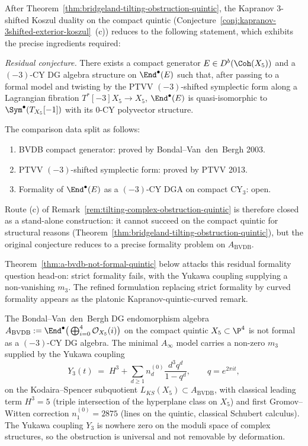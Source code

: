 \begin{remark}
\label{rem:kapranov-quintic-residual}
After Theorem~\ref{thm:bridgeland-tilting-obstruction-quintic}, the
Kapranov $3$-shifted Koszul duality on the compact quintic
(Conjecture~\ref{conj:kapranov-3shifted-exterior-koszul}~(c)) reduces
to the following statement, which exhibits the precise
ingredients required:

\textit{Residual conjecture.} There exists a compact
generator $E\in D^b(\Coh(X_5))$ and a $(-3)$-CY DG algebra structure on
$\End^\bullet(E)$ such that, after passing to a formal model and
twisting by the PTVV $(-3)$-shifted symplectic form along a Lagrangian
fibration $T^*[-3]X_5\to X_5$, $\End^\bullet(E)$ is quasi-isomorphic
to $\Sym^\bullet(T_{X_5}[-1])$ with its $0$-CY polyvector structure.

The comparison data split as follows:
\begin{enumerate}[label=\textup{(\alph*)}]
 \item BVDB compact generator: proved by Bondal--Van~den~Bergh 2003.
 \item PTVV $(-3)$-shifted symplectic form: proved by PTVV 2013.
 \item Formality of $\End^\bullet(E)$ as a $(-3)$-CY DGA on compact
 CY$_3$: open.
\end{enumerate}
Route (c) of Remark~\ref{rem:tilting-complex-obstruction-quintic} is
therefore closed as a stand-alone construction: it cannot succeed on
the compact quintic for structural reasons
(Theorem~\ref{thm:bridgeland-tilting-obstruction-quintic}), but the
original conjecture reduces to a precise formality problem on
$A_{\mathrm{BVDB}}$.

Theorem~\ref{thm:a-bvdb-not-formal-quintic} below attacks this residual
formality question head-on: strict formality fails, with the Yukawa
coupling supplying a non-vanishing $m_3$. The refined formulation
replacing strict formality by curved formality appears as
the platonic Kapranov-quintic-curved remark.
\end{remark}

\begin{theorem}
\label{thm:a-bvdb-not-formal-quintic}
The Bondal--Van~den~Bergh DG endomorphism algebra
$A_{\mathrm{BVDB}} := \End^\bullet\big(\bigoplus_{i=0}^4 \mathcal{O}_{X_5}(i)\big)$
on the compact quintic $X_5\subset\P^4$ is not formal as a $(-3)$-CY DG
algebra. The minimal $A_\infty$ model carries a non-zero $m_3$ supplied
by the Yukawa coupling
\[
 Y_3(t) \;=\; H^3 + \sum_{d\geq 1} n_d^{(0)} \frac{d^3 q^d}{1 - q^d},
 \qquad q = e^{2\pi i t},
\]
on the Kodaira--Spencer subquotient $L_{KS}(X_5)\subset A_{\mathrm{BVDB}}$,
with classical leading term $H^3 = 5$ (triple intersection of the
hyperplane class on $X_5$) and first Gromov--Witten correction
$n_1^{(0)} = 2875$ (lines on the quintic, classical Schubert calculus).
The Yukawa coupling $Y_3$ is nowhere zero on the moduli space of
complex structures, so the obstruction is universal and not removable
by deformation.
\end{theorem}

